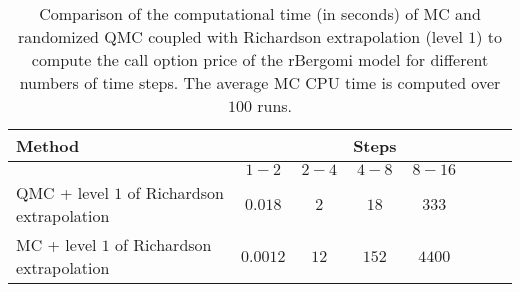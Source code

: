 \begin{table}[h!]
	\centering
	\begin{tabular}{l*{6}{c}r}
		\toprule[1.5pt]
		Method & &   & Steps & &     \\
		\hline
		& $1-2$ & $2-4$ & $4-8$ & $8-16$   \\
		\hline	
		QMC + level $1$ of  Richardson extrapolation  &$0.018$ & $2$  & $18$  & $333$   \\
		\hline	
		MC + level $1$ of  Richardson extrapolation &$
		0.0012$ & $12$  & $152$  & $4400$ \\
		\bottomrule[1.25pt]
	\end{tabular}
	\caption{Comparison of the computational time (in seconds) of  MC and randomized QMC coupled with Richardson extrapolation (level $1$) to compute the call option price of the rBergomi model for different numbers of time steps. The average MC CPU time is computed over $100$ runs.}
	\label{Comparsion of the computational time of  MC and MISC, using Richardson extrapolation (level $1$), used to compute Call option price of rBergomi model for different number of time steps. Case set $2$ parameters,linear}
\end{table}

\FloatBarrier

%
%		
%		




